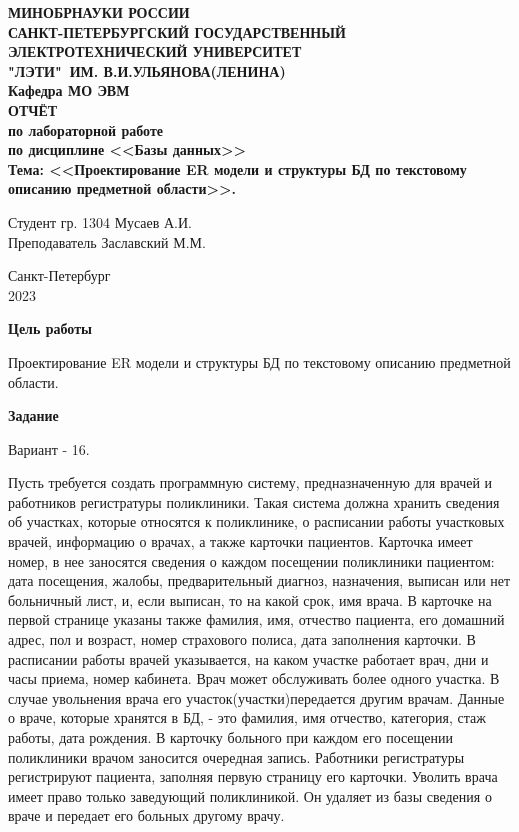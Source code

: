 \documentclass{article}
\date{\today}
\begin{document}
\thispagestyle{empty}
\begin{center}
    \LARGE\textbf{МИНОБРНАУКИ РОССИИ\\
        САНКТ-ПЕТЕРБУРГСКИЙ ГОСУДАРСТВЕННЫЙ\\
        ЭЛЕКТРОТЕХНИЧЕСКИЙ УНИВЕРСИТЕТ\\
        "ЛЭТИ"\ ИМ. В.И.УЛЬЯНОВА(ЛЕНИНА)\\
        Кафедра МО ЭВМ}\\[4cm]
    \Large\textbf{ОТЧЁТ}\\[0.2cm]
    \Large\textbf{по лабораторной работе}\\[0.1cm]
    \Large\textbf{по дисциплине <<Базы данных>>}\\[0.1cm]
    \Large\textbf{Тема: <<Проектирование ER модели и структуры БД по текстовому описанию предметной области>>.}\\[3cm]
\end{center}
\Large{Студент гр. 1304 \qquad \qquad \quad \underline{\hspace{6cm}} \qquad \qquad Мусаев А.И.}\\[0.5cm]
\Large{Преподаватель \qquad \qquad \qquad \underline{\hspace{6cm}} \qquad \qquad Заславский М.М.}\\[1cm]
\begin{center}
    Санкт-Петербург\\
    2023
\end{center}
\newpage

\textbf{Цель работы}

Проектирование ER модели и структуры БД по текстовому описанию предметной области.

\textbf{Задание}

Вариант - 16.

Пусть требуется создать программную систему, предназначенную для врачей и работников регистратуры поликлиники. Такая система должна хранить сведения об участках, которые относятся к поликлинике, о расписании работы участковых врачей, информацию о врачах, а также карточки пациентов. Карточка имеет номер, в нее заносятся сведения о каждом посещении поликлиники пациентом: дата посещения, жалобы, предварительный диагноз, назначения, выписан или нет больничный лист, и, если выписан, то на какой срок, имя врача. В карточке на первой странице указаны также фамилия, имя, отчество пациента, его домашний адрес, пол и возраст, номер страхового полиса, дата заполнения карточки. В расписании работы врачей указывается, на каком участке работает врач, дни и часы приема, номер кабинета. Врач может обслуживать более одного участка. В случае увольнения врача его участок(участки)передается другим врачам. Данные о враче, которые хранятся в БД, - это фамилия, имя отчество, категория, стаж работы, дата рождения. В карточку больного при каждом его посещении поликлиники врачом заносится очередная запись. Работники регистратуры регистрируют пациента, заполняя первую страницу его карточки. Уволить врача имеет право только заведующий поликлиникой. Он удаляет из базы сведения о враче и передает его больных другому врачу.
\end{document}
